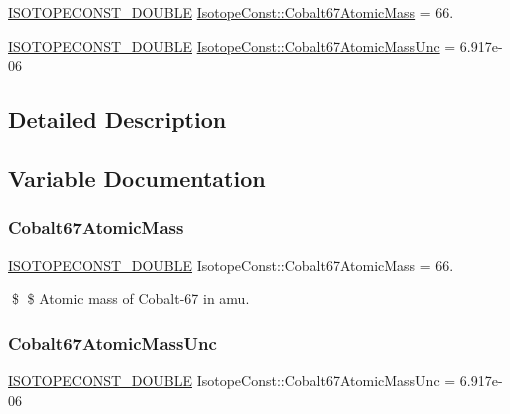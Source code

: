 \begin{DoxyCompactItemize}
\item 
\mbox{\hyperlink{group___isotope_const-_macros_ga8f45a7272ce02c0b4c65c44636ed719a}{I\+S\+O\+T\+O\+P\+E\+C\+O\+N\+S\+T\+\_\+\+D\+O\+U\+B\+LE}} \mbox{\hyperlink{group___isotope_const-_cobalt-_co67_ga9984bd7b46bdd075dd3cb68108d8acc8}{Isotope\+Const\+::\+Cobalt67\+Atomic\+Mass}} = 66.
\item 
\mbox{\hyperlink{group___isotope_const-_macros_ga8f45a7272ce02c0b4c65c44636ed719a}{I\+S\+O\+T\+O\+P\+E\+C\+O\+N\+S\+T\+\_\+\+D\+O\+U\+B\+LE}} \mbox{\hyperlink{group___isotope_const-_cobalt-_co67_ga3d8695643c2e14be4ba4972c4d9abfab}{Isotope\+Const\+::\+Cobalt67\+Atomic\+Mass\+Unc}} = 6.\+917e-\/06
\end{DoxyCompactItemize}


\subsection{Detailed Description}


\subsection{Variable Documentation}
\mbox{\label{group___isotope_const-_cobalt-_co67_ga9984bd7b46bdd075dd3cb68108d8acc8}} 
\subsubsection{\texorpdfstring{Cobalt67\+Atomic\+Mass}{Cobalt67AtomicMass}}
{\footnotesize\ttfamily \mbox{\hyperlink{group___isotope_const-_macros_ga8f45a7272ce02c0b4c65c44636ed719a}{I\+S\+O\+T\+O\+P\+E\+C\+O\+N\+S\+T\+\_\+\+D\+O\+U\+B\+LE}} Isotope\+Const\+::\+Cobalt67\+Atomic\+Mass = 66.}

\$ \$ Atomic mass of Cobalt-\/67 in amu. \mbox{\label{group___isotope_const-_cobalt-_co67_ga3d8695643c2e14be4ba4972c4d9abfab}} 
\subsubsection{\texorpdfstring{Cobalt67\+Atomic\+Mass\+Unc}{Cobalt67AtomicMassUnc}}
{\footnotesize\ttfamily \mbox{\hyperlink{group___isotope_const-_macros_ga8f45a7272ce02c0b4c65c44636ed719a}{I\+S\+O\+T\+O\+P\+E\+C\+O\+N\+S\+T\+\_\+\+D\+O\+U\+B\+LE}} Isotope\+Const\+::\+Cobalt67\+Atomic\+Mass\+Unc = 6.\+917e-\/06}

